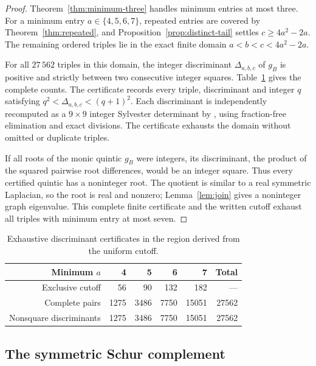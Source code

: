 \begin{proof}
Theorem~\ref{thm:minimum-three} handles minimum entries at most three.
For a minimum entry $a\in\{4,5,6,7\}$, repeated entries are covered by
Theorem~\ref{thm:repeated}, and Proposition~\ref{prop:distinct-tail}
settles $c\geq4a^2-2a$. The remaining ordered triples lie in the exact
finite domain $a<b<c<4a^2-2a$.

For all $27\,562$ triples in this domain, the integer discriminant
$\Delta_{a,b,c}$ of $g_B$ is positive and strictly between two
consecutive integer squares. Table~\ref{tab:open-region} gives the
complete counts. The certificate
 records every triple,
discriminant and integer $q$ satisfying
$q^2<\Delta_{a,b,c}<(q+1)^2$. Each discriminant is independently
recomputed as a $9\times9$ integer Sylvester determinant by
, using fraction-free
elimination and exact divisions. The certificate exhausts the domain
without omitted or duplicate triples.

If all roots of the monic quintic $g_B$ were integers, its discriminant,
the product of the squared pairwise root differences, would be an
integer square. Thus every certified quintic has a noninteger root.
The quotient is similar to a real symmetric Laplacian, so the root is
real and nonzero; Lemma~\ref{lem:join} gives a noninteger graph
eigenvalue. This complete finite certificate and the written cutoff
exhaust all triples with minimum entry at most seven.
\end{proof}

\begin{table}[ht]
\centering
\begin{tabular}{rrrrrr}
\toprule
Minimum $a$&4&5&6&7&Total\\
\midrule
Exclusive cutoff&56&90&132&182&---\\
Complete pairs&1275&3486&7750&15051&27562\\
Nonsquare discriminants&1275&3486&7750&15051&27562\\
\bottomrule
\end{tabular}
\caption{Exhaustive discriminant certificates in the region derived from
the uniform cutoff.}
\label{tab:open-region}
\end{table}

\subsection{The symmetric Schur complement}

